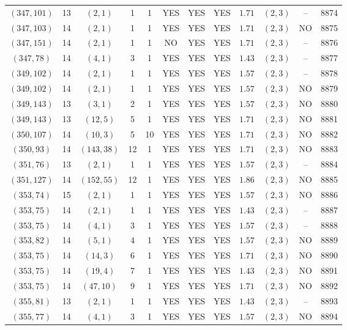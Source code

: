 \begin{longtable}{|c|c|c|c|c|c|c|c|c|c|c|c|}
$(347,101)$ & 13 & $(2,1)$ & 1 & 1 & YES & YES & YES & $1.71$ & $(2,3)$ & -- & 8874\\
$(347,103)$ & 14 & $(2,1)$ & 1 & 1 & YES & YES & YES & $1.71$ & $(2,3)$ & NO & 8875\\
$(347,151)$ & 14 & $(2,1)$ & 1 & 1 & NO & YES & YES & $1.71$ & $(2,3)$ & -- & 8876\\
$(347,78)$ & 14 & $(4,1)$ & 3 & 1 & YES & YES & YES & $1.43$ & $(2,3)$ & -- & 8877\\
$(349,102)$ & 14 & $(2,1)$ & 1 & 1 & YES & YES & YES & $1.57$ & $(2,3)$ & -- & 8878\\
$(349,102)$ & 14 & $(2,1)$ & 1 & 1 & YES & YES & YES & $1.57$ & $(2,3)$ & NO & 8879\\
$(349,143)$ & 13 & $(3,1)$ & 2 & 1 & YES & YES & YES & $1.57$ & $(2,3)$ & NO & 8880\\
$(349,143)$ & 13 & $(12,5)$ & 5 & 1 & YES & YES & YES & $1.71$ & $(2,3)$ & NO & 8881\\
$(350,107)$ & 14 & $(10,3)$ & 5 & 10 & YES & YES & YES & $1.71$ & $(2,3)$ & NO & 8882\\
$(350,93)$ & 14 & $(143,38)$ & 12 & 1 & YES & YES & YES & $1.71$ & $(2,3)$ & NO & 8883\\
$(351,76)$ & 13 & $(2,1)$ & 1 & 1 & YES & YES & YES & $1.57$ & $(2,3)$ & -- & 8884\\
$(351,127)$ & 14 & $(152,55)$ & 12 & 1 & YES & YES & YES & $1.86$ & $(2,3)$ & NO & 8885\\
$(353,74)$ & 15 & $(2,1)$ & 1 & 1 & YES & YES & YES & $1.57$ & $(2,3)$ & NO & 8886\\
$(353,75)$ & 14 & $(2,1)$ & 1 & 1 & YES & YES & YES & $1.43$ & $(2,3)$ & -- & 8887\\
$(353,75)$ & 14 & $(4,1)$ & 3 & 1 & YES & YES & YES & $1.57$ & $(2,3)$ & -- & 8888\\
$(353,82)$ & 14 & $(5,1)$ & 4 & 1 & YES & YES & YES & $1.57$ & $(2,3)$ & NO & 8889\\
$(353,75)$ & 14 & $(14,3)$ & 6 & 1 & YES & YES & YES & $1.71$ & $(2,3)$ & NO & 8890\\
$(353,75)$ & 14 & $(19,4)$ & 7 & 1 & YES & YES & YES & $1.43$ & $(2,3)$ & NO & 8891\\
$(353,75)$ & 14 & $(47,10)$ & 9 & 1 & YES & YES & YES & $1.71$ & $(2,3)$ & NO & 8892\\
$(355,81)$ & 13 & $(2,1)$ & 1 & 1 & YES & YES & YES & $1.43$ & $(2,3)$ & -- & 8893\\
$(355,77)$ & 14 & $(4,1)$ & 3 & 1 & YES & YES & YES & $1.57$ & $(2,3)$ & NO & 8894\\

\end{longtable}
